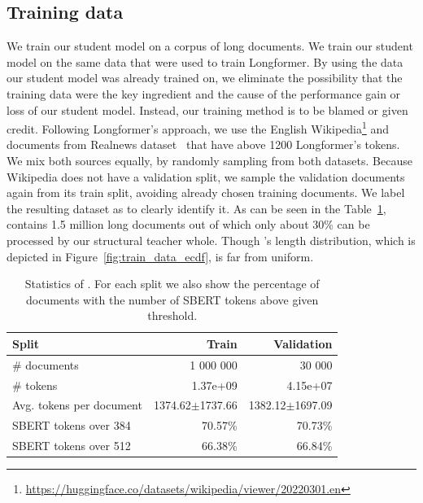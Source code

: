 \subsection{Training data}



We train our student model on a corpus of long documents. We train our student
model on the same data that were used to train Longformer. By using the data our
student model was already trained on, we eliminate the possibility that the
training data were the key ingredient and the cause of the performance gain or
loss of our student model. Instead, our training method is to be blamed or given
credit. Following Longformer's approach, we use the English
Wikipedia\footnote{\url{https://huggingface.co/datasets/wikipedia/viewer/20220301.en}}
and documents from Realnews dataset~\citep{zellers2019defending} that have above
1200 Longformer's tokens. We mix both sources equally, by randomly sampling from
     both datasets. Because Wikipedia does not have a validation split, we
     sample the validation documents again from its train split, avoiding
     already chosen training documents. We label the resulting dataset as
      to clearly identify it. As can be seen in the
     Table~\ref{table:train_data_stats},  contains 1.5
     million long documents out of which only about 30\% can be processed by our
     structural teacher whole. Though 's length
     distribution, which is depicted in Figure~\ref{fig:train_data_ecdf}, is far
     from uniform.

\begin{table}
    \centering
\begin{tabular}{lrr}
\toprule
Split & Train & Validation \\
\midrule
\# documents & 1 000 000 & 30 000 \\
\# tokens & 1.37e+09 & 4.15e+07 \\
Avg. tokens per document & 1374.62$\pm$1737.66 & 1382.12$\pm$1697.09 \\
SBERT tokens over 384 & 70.57\% & 70.73\% \\
SBERT tokens over 512 & 66.38\% & 66.84\% \\
\bottomrule
\end{tabular}


    \caption{Statistics of . For each split we also show
    the percentage of documents with the number of SBERT tokens above given
    threshold.}

    \label{table:train_data_stats}

\end{table}

